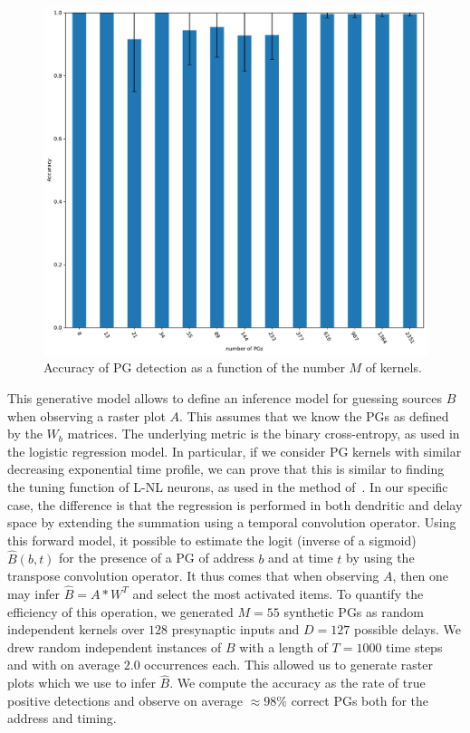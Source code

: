 \documentclass[11pt]{article}
\begin{document}
\begin{figure}
\vspace{-15pt}
\includegraphics[width=\linewidth]{figure_N_PGs.pdf}
\vspace{-25pt}
{
\caption{Accuracy of PG detection as a function of the number $M$ of kernels.
}
\label{fig:2}
}
\vspace{-10pt}
\end{figure}
This generative model allows to define an inference model for guessing sources $B$ when observing a raster plot $A$. This assumes that we know the PGs as defined by the $W_b$ matrices. The underlying metric is the binary cross-entropy, as used in the logistic regression model. In particular, if we consider PG kernels with similar decreasing exponential time profile, we can prove that this is similar to finding the tuning function of L-NL neurons, as used in the method of~\parencite{berens_fast_2012}. In our specific case, the difference is that the regression is performed in both dendritic and delay space by extending the summation using a temporal convolution operator. Using this forward model, it possible to estimate the logit (inverse of a sigmoid) $\hat{B}(b, t)$ for the presence of a PG of address $b$ and at time $t$ by using the transpose convolution operator. It thus comes that when observing $A$, then one may infer $\hat{B} = A \ast W^T$ and select the most activated items. To quantify the efficiency of this operation, we generated $M=55$ synthetic PGs as random independent kernels over $128$ presynaptic inputs and $D=127$ possible delays. We drew random independent instances of $B$ with a length of $T=1000$ time steps and with on average $2.0$ occurrences each. This allowed us to generate raster plots which we use to infer $\hat{B}$. We compute the accuracy as the rate of true positive detections and observe on average $\approx 98\%$ correct PGs both for the address and %
timing.
\end{document}
